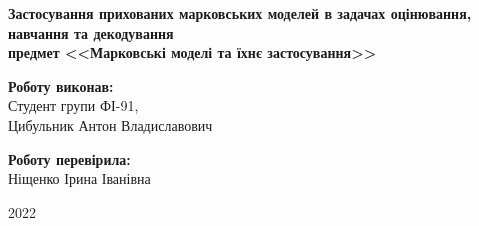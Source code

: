 \begin{titlepage}
    \begin{center}
        \begin{spacing}{1.5}
            \textbf{\Large{Застосування прихованих марковських \linebreak моделей в задачах оцінювання, навчання \linebreak та декодування}} \\ 
            \vspace{1cm}\textbf{\normalsize{предмет <<Марковські моделі та їхнє застосування>>}}
        \end{spacing}
    \end{center}
    
    \vspace{\fill}
    
    \newlength{\maxname}

    \hfill\parbox{\maxname}{
        \begin{spacing}{1.1}
            \small{\textbf{Роботу виконав:}} \\ 
            \small{Студент групи ФІ-91,} \\
            \small{Цибульник Антон Владиславович} \\
        \end{spacing}
    }

    \hfill\parbox{\maxname}{
        \begin{spacing}{1.1}
            \small{\textbf{Роботу перевірила:}} \\ 
            \small{Ніщенко Ірина Іванівна} \\
        \end{spacing}
    }

    \vspace{0.5cm}

    \begin{center}
        \small{2022}
    \end{center}
    
\end{titlepage}